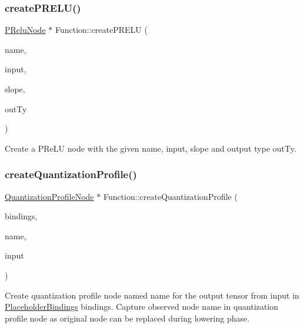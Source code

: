 \subsubsection{\texorpdfstring{create\+P\+R\+E\+L\+U()}{createPRELU()}\hspace{0.1cm}{\footnotesize\ttfamily [2/2]}}
{\footnotesize\ttfamily \hyperlink{classglow_1_1_p_relu_node}{P\+Relu\+Node} $\ast$ Function\+::create\+P\+R\+E\+LU (\begin{DoxyParamCaption}\item[{llvm\+::\+String\+Ref}]{name,  }\item[{\hyperlink{structglow_1_1_node_value}{Node\+Value}}]{input,  }\item[{\hyperlink{structglow_1_1_node_value}{Node\+Value}}]{slope,  }\item[{\hyperlink{structglow_1_1_type}{Type\+Ref}}]{out\+Ty }\end{DoxyParamCaption})}

Create a P\+Re\+LU node with the given {\ttfamily name}, {\ttfamily input}, {\ttfamily slope} and output type {\ttfamily out\+Ty}. \mbox{\label{classglow_1_1_function_ae9866986d73736c124e1bfaf3222aa13}} 
\subsubsection{\texorpdfstring{create\+Quantization\+Profile()}{createQuantizationProfile()}}
{\footnotesize\ttfamily \hyperlink{classglow_1_1_quantization_profile_node}{Quantization\+Profile\+Node} $\ast$ Function\+::create\+Quantization\+Profile (\begin{DoxyParamCaption}\item[{\hyperlink{classglow_1_1_placeholder_bindings}{Placeholder\+Bindings} \&}]{bindings,  }\item[{llvm\+::\+String\+Ref}]{name,  }\item[{\hyperlink{structglow_1_1_node_value}{Node\+Value}}]{input }\end{DoxyParamCaption})}

Create quantization profile node named {\ttfamily name} for the output tensor from {\ttfamily input} in \hyperlink{classglow_1_1_placeholder_bindings}{Placeholder\+Bindings} {\ttfamily bindings}. Capture observed node name in quantization profile node as original node can be replaced during lowering phase. \mbox{\label{classglow_1_1_function_a5137409e46739131c920052ea550b003}} 
